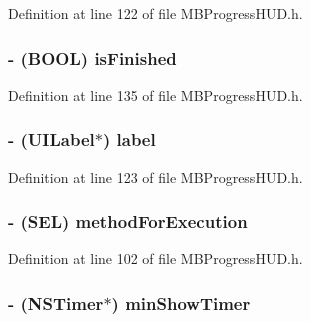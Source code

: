 Definition at line 122 of file MBProgressHUD.h.

\hypertarget{interface_m_b_progress_h_u_d_a2f9955018d8c22980f27a7f93876e39a}{
\subsubsection[{isFinished}]{\setlength{\rightskip}{0pt plus 5cm}-\/ (BOOL) {\bf isFinished}}}
\label{interface_m_b_progress_h_u_d_a2f9955018d8c22980f27a7f93876e39a}


Definition at line 135 of file MBProgressHUD.h.

\hypertarget{interface_m_b_progress_h_u_d_a077d2090d973b1d47c6e3d6e0c47e8af}{
\subsubsection[{label}]{\setlength{\rightskip}{0pt plus 5cm}-\/ (UILabel$\ast$) {\bf label}}}
\label{interface_m_b_progress_h_u_d_a077d2090d973b1d47c6e3d6e0c47e8af}


Definition at line 123 of file MBProgressHUD.h.

\hypertarget{interface_m_b_progress_h_u_d_ae28780a2d6fe7834cc029fbbdf206b62}{
\subsubsection[{methodForExecution}]{\setlength{\rightskip}{0pt plus 5cm}-\/ (SEL) {\bf methodForExecution}}}
\label{interface_m_b_progress_h_u_d_ae28780a2d6fe7834cc029fbbdf206b62}


Definition at line 102 of file MBProgressHUD.h.

\hypertarget{interface_m_b_progress_h_u_d_a697ca7d4c1e40af232c289e8ab9b1ff6}{
\subsubsection[{minShowTimer}]{\setlength{\rightskip}{0pt plus 5cm}-\/ (NSTimer$\ast$) {\bf minShowTimer}}}
\label{interface_m_b_progress_h_u_d_a697ca7d4c1e40af232c289e8ab9b1ff6}


